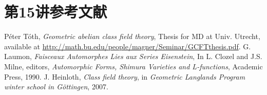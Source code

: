 \section{第15讲参考文献}\label{L15S4}
\begin{references}
 Péter Tóth, \emph{Geometric abelian class field theory}, Thesis for MD at Univ. Utrecht, available at \url{http://math.bu.edu/people/magner/Seminar/GCFTthesis.pdf}.
 G. Laumon, \emph{Faisceaux Automorphes Lies aux Series Eisenstein}, In L. Clozel and J.S. Milne, editors, \emph{Automorphic Forms, Shimura Varieties and L-functions}, Academic Press, 1990.
 J. Heinloth, \emph{Class field theory}, in \emph{Geometric Langlands Program winter school in Göttingen}, 2007.
\end{references}

